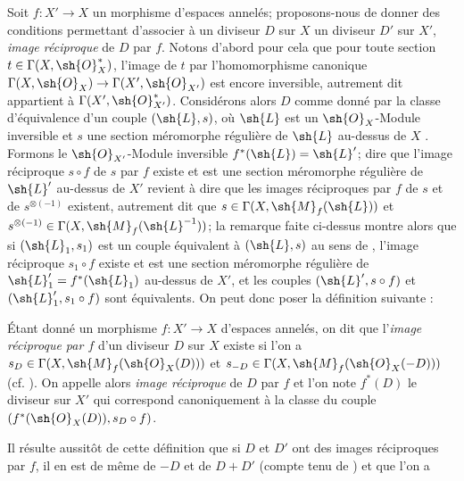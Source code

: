 \begin{env}[21.4.1]
Soit $f:X'\to X$ un morphisme d'espaces annelés;
proposons-nous de donner des conditions permettant d'associer à un diviseur $D$ sur $X$ un diviseur $D'$ sur $X'$, \emph{image réciproque} de $D$ par $f$.
Notons d'abord pour cela que pour toute section $t\in\Gamma(X,\sh{O}_X^*)$, l'image de $t$ par l'homomorphisme canonique $\Gamma(X,\sh{O}_X)\to\Gamma(X',\sh{O}_{X'})$ est encore inversible, autrement dit appartient à $\Gamma(X',\sh{O}_{X'}^*)$.
Considérons alors $D$ comme donné par la classe d'équivalence d'un couple $(\sh{L},s)$, où $\sh{L}$ est un $\sh{O}_X$-Module inversible et $s$ une section méromorphe régulière de $\sh{L}$ au-dessus de $X$ .
Formons le $\sh{O}_{X'}$-Module inversible $f^*(\sh{L})=\sh{L}'$;
dire que l'image réciproque $s\circ f$ de $s$ par $f$ existe  et est une section méromorphe régulière de $\sh{L}'$ au-dessus de $X'$ revient à dire que les images réciproques par $f$ de $s$ et de $s^{\otimes(-1)}$ existent, autrement dit que $s\in\Gamma(X,\sh{M}_f(\sh{L}))$ et $s^{\otimes(-1)}\in\Gamma(X,\sh{M}_f(\sh{L}^{-1}))$;
la remarque faite ci-dessus montre alors que si $(\sh{L}_1,s_1)$ est un couple équivalent à $(\sh{L},s)$ au sens de , l'image réciproque $s_1\circ f$ existe et est une section méromorphe régulière de $\sh{L}_1'=f^*(\sh{L}_1)$ au-dessus de $X'$, et les couples $(\sh{L}',s\circ f)$ et $(\sh{L}_1',s_1\circ f)$ sont équivalents.
On peut donc poser la définition suivante :
\end{env}

\begin{definition}[21.4.2]
Étant donné un morphisme $f:X'\to X$ d'espaces annelés, on dit que l'\emph{image réciproque par $f$} d'un diviseur $D$ sur $X$ existe si l'on a $s_D\in\Gamma(X,\sh{M}_f(\sh{O}_X(D)))$ et $s_{-D}\in\Gamma(X,\sh{M}_f(\sh{O}_X(-D)))$ (cf. ).
On appelle alors \emph{image réciproque} de $D$ par $f$ et l'on note $f^*(D)$ le diviseur sur $X'$ qui correspond canoniquement  à la classe du couple $(f^*(\sh{O}_X(D)),s_D\circ f)$.
\end{definition}

Il résulte aussitôt de cette définition que si $D$ et $D'$ ont des images réciproques par $f$, il en est de même de $-D$ et de $D+D'$ (compte tenu de ) et que l'on a
